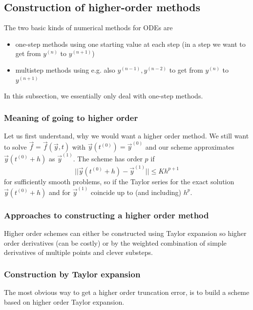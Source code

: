 \subsection{Construction of higher-order methods}
The two basic kinds of numerical methods for ODEs are
\begin{itemize}
  \item one-step methods using one starting value at each step (in a step we want to get from $y^{(n)}$ to $y^{(n+1)}$)
  \item multistep methods using e.g. also $y^{(n-1)}, y^{(n-2)}$ to get from $y^{(n)}$ to $y^{(n+1)}$
\end{itemize}
In this subsection, we essentially only deal with one-step methods.

\subsubsection{Meaning of going to higher order}
Let us first understand, why we would want a higher order method. We still want to solve $\vec{f} = \vec{f}(\vec{y}, t)$ with $\vec{y}(t^{(0)}) = \vec{y}^{(0)}$
and our scheme approximates $\vec{y}(t^{(0)} + h)$ as $\vec{y}^{(1)}$. The scheme has order $p$ if
\begin{equation}
  ||\vec{y}(t^{(0)} + h) - \vec{y}^{(1)} || \leq K h^{p+1}
\end{equation}
for sufficiently smooth problems, so if the Taylor series for the exact solution $\vec{y}(t^{(0)} + h)$ and for $\vec{y}^{(1)}$
coincide up to (and including) $h^p$.

\subsubsection{Approaches to constructing a higher order method}
Higher order schemes can either be constructed using Taylor expansion so 
higher order derivatives (can be costly) or by the weighted combination of 
simple derivatives of multiple points and clever substeps.

\subsubsection{Construction by Taylor expansion}
The most obvious way to get a higher order truncation error, is to build a scheme based on higher order Taylor expansion.

